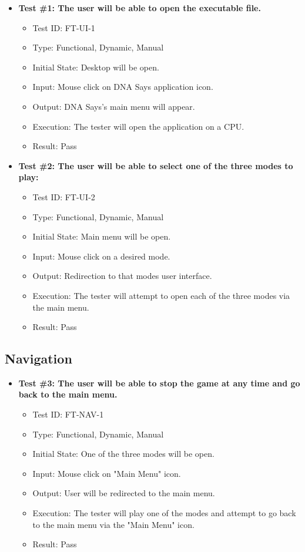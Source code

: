 \documentclass[12pt, titlepage]{article}
\begin{document}
\begin{itemize}


\item \textbf{Test \#1: The user will be able to open the executable file.}
\begin{itemize}
\item Test ID: FT-UI-1
\item Type: Functional, Dynamic, Manual		
\item Initial State: Desktop will be open. 					
\item Input: Mouse click on DNA Says application icon. 					
\item Output: DNA Says's main menu will appear. 					
\item Execution: The tester will open the application on a CPU.
\item Result: Pass
\end{itemize}

\item \textbf{Test \#2: The user will be able to select one of the three modes to play:} 
\begin{itemize}
\item Test ID: FT-UI-2
\item Type: Functional, Dynamic, Manual 		
\item Initial State: Main menu will be open. 					
\item Input: Mouse click on a desired mode. 					
\item Output: Redirection to that modes user interface.					
\item Execution: The tester will attempt to open each of the three modes via the main menu.
\item Result: Pass
\end{itemize}

\end{itemize}


\subsection{Navigation}

\begin{itemize}

\item \textbf{Test \#3: The user will be able to stop the game at any time and go back to the main menu.}
\begin{itemize}
\item Test ID: FT-NAV-1
\item Type: Functional, Dynamic, Manual 		
\item Initial State: One of the three modes will be open.					
\item Input: Mouse click on "Main Menu" icon.					
\item Output: User will be redirected to the main menu.					
\item Execution: The tester will play one of the modes and attempt to go back to the main menu via the "Main Menu" icon.
\item Result: Pass
\end{itemize}

\end{itemize}
\end{document}
